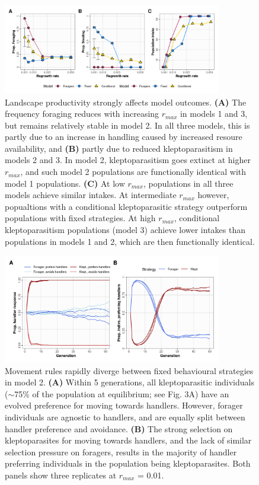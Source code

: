 \documentclass[11pt]{article}
\begin{document}
\begin{figure}[h!]
    \centering
    \includegraphics[width=0.85\textwidth]{figures/fig_06.png}
    \caption{Landscape productivity strongly affects model outcomes.
    \textbf{(A)} The frequency foraging reduces with increasing $r_{max}$ in models 1 and 3, but remains relatively stable in model 2. In all three models, this is partly due to an increase in handling caused by increased resoure availability, and \textbf{(B)} partly due to reduced kleptoparasitism in models 2 and 3. In model 2, kleptoparasitism goes extinct at higher $r_{max}$, and such model 2 populations are functionally identical with model 1 populations.
    \textbf{(C)} At low $r_{max}$, populations in all three models achieve similar intakes. At intermediate $r_{max}$ however, popualtions with a conditional kleptoparasitic strategy outperform populations with fixed strategies. At high $r_{max}$, conditional kleptoparasitism populations (model 3) achieve lower intakes than populations in models 1 and 2, which are then functionally identical.
    }
    \label{Fig:Sensitivity}
\end{figure}

\begin{figure}[h!]
    \centering
    \includegraphics[width=0.85\textwidth]{figures/fig_07.png}
    \caption{
       Movement rules rapidly diverge between fixed behavioural strategies in model 2.
       \textbf{(A)} Within 5 generations, all kleptoparasitic individuals ($\sim$75\% of the population at equilibrium; see Fig. 3A) have an evolved preference for moving towards handlers.
       However, forager individuals are agnostic to handlers, and are equally split between handler preference and avoidance.
       \textbf{(B)} The strong selection on kleptoparasites for moving towards handlers, and the lack of similar selection pressure on foragers, results in the majority of handler preferring individuals in the population being kleptoparasites.
       Both panels show three replicates at $r_{max}$ = 0.01.
    }
    \label{Fig:Syndrome}
\end{figure}
\end{document}
